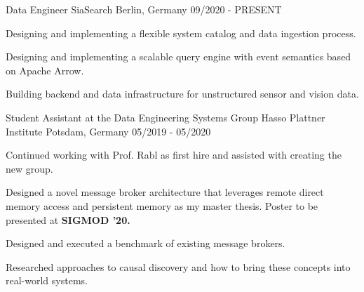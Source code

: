 

\begin{cventries}

  \cventry
    {Data Engineer} %
    {SiaSearch} %
    {Berlin, Germany} %
    {09/2020 - PRESENT} %
    {
      \begin{cvitems} %
      \item{Designing and implementing a flexible system catalog and data ingestion process.}
      \item{Designing and implementing a scalable query engine with event semantics based on Apache Arrow.}
      \item{Building backend and data infrastructure for unstructured sensor and vision data.}
      \end{cvitems}
    }

  \cventry
    {Student Assistant at the Data Engineering Systems Group} %
    {Hasso Plattner Institute} %
    {Potsdam, Germany} %
    {05/2019 - 05/2020} %
    {
      \begin{cvitems} %
      \item{Continued working with Prof. Rabl as first hire and assisted with creating the new group.}
      \item{Designed a novel message broker architecture that leverages remote direct memory access and persistent memory as my master thesis. Poster to be presented at \textbf{SIGMOD '20.}}
      \item{Designed and executed a benchmark of existing message brokers.}
      \item{Researched approaches to causal discovery and how to bring these concepts into real-world systems.}
      \end{cvitems}
    }


\end{cventries}
